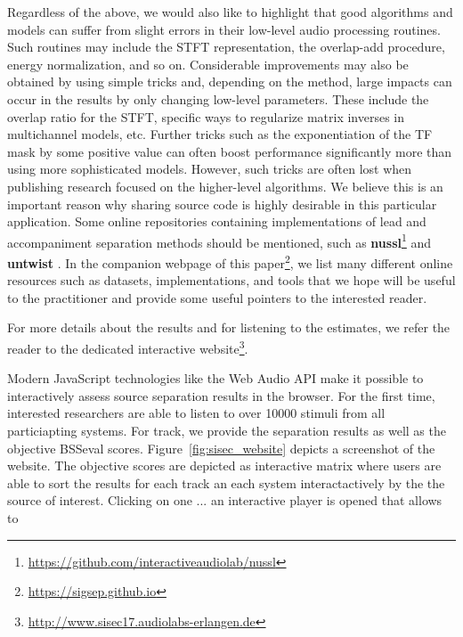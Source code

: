 Regardless of the above, we would also like to highlight that good algorithms and models can suffer from slight errors in their low-level audio processing routines. Such routines may include the STFT representation, the overlap-add procedure, energy normalization, and so on. Considerable improvements may also be obtained by using simple tricks and, depending on the method, large impacts can occur in the results by only changing low-level parameters. These include
the overlap ratio for the STFT, specific ways to regularize matrix inverses in multichannel models, etc. Further tricks such as the exponentiation of the TF mask by some positive value can often boost performance significantly more than using more sophisticated models. However, such tricks are often lost when publishing research focused on the higher-level algorithms. We believe this is an important reason why sharing source code is highly desirable in this particular application. Some online repositories containing implementations of lead and accompaniment separation methods should be mentioned, such as \textbf{nussl}\footnote{\url{https://github.com/interactiveaudiolab/nussl}} and \textbf{untwist} \cite{roma16}. In the companion webpage of this paper\footnote{\url{https://sigsep.github.io}}, we list many different online resources such as datasets, implementations, and tools that we hope will be useful to the practitioner and provide some useful pointers to the interested reader.

For more details about the results and for listening to the estimates, we refer the reader to the dedicated interactive website\footnote{\url{http://www.sisec17.audiolabs-erlangen.de}}.

Modern JavaScript technologies like the Web Audio API make it possible to interactively assess source separation results in the browser.
For the first time, interested researchers are able to listen to over 10000 stimuli from all particiapting systems.
For track, we provide the separation results as well as the objective BSSeval scores.
Figure~\ref{fig:sisec_website} depicts a screenshot of the website.
The objective scores are depicted as interactive matrix where users are able to sort the results for each track an each system interactactively by the the source of interest.
Clicking on one ... an interactive player is opened that allows to


